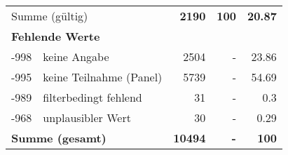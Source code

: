 \begin{longtable}{lXrrr}
     \midrule
     \multicolumn{2}{l}{Summe (gültig)} &
       \textbf{\num{2190}} &
     \textbf{100} &
       \textbf{\num[round-mode=places,round-precision=2]{20,87}} \\
     \multicolumn{5}{l}{\textbf{Fehlende Werte}}\\
       -998 &
       keine Angabe &
         \num{2504} &
        - &
         \num[round-mode=places,round-precision=2]{23,86} \\
       -995 &
       keine Teilnahme (Panel) &
         \num{5739} &
        - &
         \num[round-mode=places,round-precision=2]{54,69} \\
       -989 &
       filterbedingt fehlend &
         \num{31} &
        - &
         \num[round-mode=places,round-precision=2]{0,3} \\
       -968 &
       unplausibler Wert &
         \num{30} &
        - &
         \num[round-mode=places,round-precision=2]{0,29} \\
     \midrule
     \multicolumn{2}{l}{\textbf{Summe (gesamt)}} &
          \textbf{\num{10494}} &
        \textbf{-} &
        \textbf{100} \\
     \bottomrule
     \end{longtable}
     
